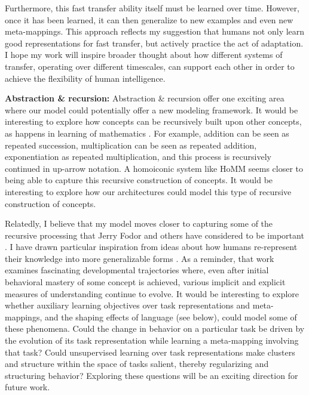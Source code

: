Furthermore, this fast transfer ability itself must be learned over time. However, once it has been learned, it can then generalize to new examples and even new meta-mappings. This approach reflects my suggestion that humans not only learn good representations for fast transfer, but actively practice the act of adaptation. I hope my work will inspire broader thought about how different systems of transfer, operating over different timescales, can support each other in order to achieve the flexibility of human intelligence.\par

\textbf{Abstraction \& recursion:} Abstraction \& recursion offer one exciting area where our model could potentially offer a new modeling framework. It would be interesting to explore how concepts can be recursively built upon other concepts, as happens in learning of mathematics \citep{Wilensky1991, Hazzan1999, Lampinen2017b}. For example, addition can be seen as repeated succession, multiplication can be seen as repeated addition, exponentiation as repeated multiplication, and this process is recursively continued in up-arrow notation. A homoiconic system like HoMM seems closer to being able to capture this recursive construction of concepts. It would be interesting to explore how our architectures could model this type of recursive construction of concepts. \par 

Relatedly, I believe that my model moves closer to capturing some of the recursive processing that Jerry Fodor and others have considered to be important \citep[e.g.][]{Fodor2008lot2}. I have drawn particular inspiration from ideas about how humans re-represent their knowledge into more generalizable forms \citep{Karmiloff-Smith1986,Clark1993}. As a reminder, that work examines fascinating developmental trajectories where, even after initial behavioral mastery of some concept is achieved, various implicit and explicit measures of understanding continue to evolve. It would be interesting to explore whether auxiliary learning objectives over task representations and meta-mappings, and the shaping effects of language (see below), could model some of these phenomena. Could the change in behavior on a particular task be driven by the evolution of its task representation while learning a meta-mapping involving that task? Could unsupervised learning over task representations make clusters and structure within the space of tasks salient, thereby regularizing and structuring behavior? Exploring these questions will be an exciting direction for future work. \par 

